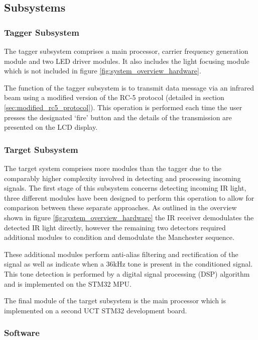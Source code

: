 \subsection{Subsystems}

\subsubsection{Tagger Subsystem}

The tagger subsystem comprises a main processor, carrier frequency generation module and two LED driver modules. It also includes the light focusing module which is not included in figure \ref{fig:system_overview_hardware}.

The function of the tagger subsystem is to transmit data message via an infrared beam using a modified version of the RC-5 protocol (detailed in section \ref{sec:modified_rc5_protocol}). This operation is performed each time the user presses the designated `fire' button and the details of the transmission are presented on the LCD display.


\subsubsection{Target Subsystem}
The target system comprises more modules than the tagger due to the comparably higher complexity involved in detecting and processing incoming signals. The first stage of this subsystem concerns detecting incoming IR light, three different modules have been designed to perform this operation to allow for comparison between these separate approaches. As outlined in the overview shown in figure \ref{fig:system_overview_hardware} the IR receiver demodulates the detected IR light directly, however the remaining two detectors required additional modules to condition and demodulate the Manchester sequence.

These additional modules perform anti-alias filtering and rectification of the signal as well as indicate when a 36kHz tone is present in the conditioned signal. This tone detection is performed by a digital signal processing (DSP) algorithm and is implemented on the STM32 MPU.

The final module of the target subsystem is the main processor which is implemented on a second UCT STM32 development board.

\subsubsection{Software}

